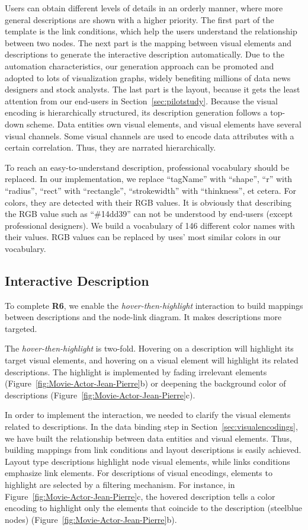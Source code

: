 Users can obtain different levels of details in an orderly manner, where more general descriptions are shown with a higher priority.
The first part of the template is the link conditions, which help the users understand the relationship between two nodes.
The next part is the mapping between visual elements and descriptions to generate the interactive description automatically. Due to the automation characteristics, our generation approach can be promoted and adopted to lots of visualization graphs, widely benefiting millions of data news designers and stock analysts. 
The last part is the layout, because it gets the least attention from our end-users in Section~\ref{sec:pilotstudy}.
Because the visual encoding is hierarchically structured, its description generation follows a top-down scheme.
Data entities own visual elements, and visual elements have several visual channels. Some visual channels are used to encode data attributes with a certain correlation.
Thus, they are narrated hierarchically.

To reach an easy-to-understand description, professional vocabulary should be replaced. In our implementation, we replace ``tagName'' with ``shape'', ``r'' with ``radius'', ``rect'' with ``rectangle'', ``stroke\-width'' with ``thinkness'', et cetera. For colors, they are detected with their RGB values. It is obviously that describing the RGB value such as ``\#14dd39'' can not be understood by end-users (except professional designers). We build a vocabulary of 146 different color names with their values. RGB values can be replaced by uses' most similar colors in our vocabulary.


\subsection{Interactive Description}
To complete \textbf{R6}, we enable the \textit{hover-then-highlight} interaction to build mappings between descriptions and the node-link diagram. It makes descriptions more targeted.

The \textit{hover-then-highlight} is two-fold. Hovering on a description will highlight its target visual elements, and hovering on a visual element will highlight its related descriptions.
The highlight is implemented by fading irrelevant elements (Figure~\ref{fig:Movie-Actor-Jean-Pierre}b) or deepening the background color of descriptions (Figure~\ref{fig:Movie-Actor-Jean-Pierre}c).

In order to implement the interaction, we needed to clarify the visual elements related to descriptions.
In the data binding step in Section~\ref{sec:visualencodings}, we have built the relationship between data entities and visual elements. Thus, building mappings from link conditions and layout descriptions is easily achieved. Layout type descriptions highlight node visual elements, while links conditions emphasize link elements. For descriptions of visual encodings, elements to highlight are selected by a filtering mechanism. For instance, in Figure~\ref{fig:Movie-Actor-Jean-Pierre}c, the hovered description tells a color encoding to highlight only the elements that coincide to the description (steelblue nodes) (Figure~\ref{fig:Movie-Actor-Jean-Pierre}b).
 

